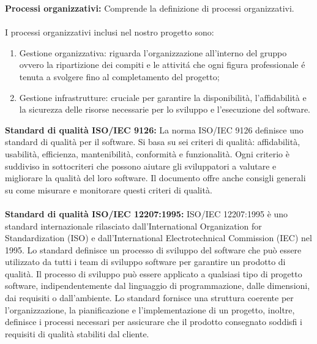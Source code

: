 \textbf{Processi organizzativi:}
Comprende la definizione di processi organizzativi.
\\\\
I processi organizzativi inclusi nel nostro progetto sono:
\begin{enumerate}
    \item Gestione organizzativa: riguarda l'organizzazione all'interno del gruppo ovvero la ripartizione dei compiti e le attivitá che ogni figura professionale é tenuta a svolgere fino al 
    completamento del progetto;
    \item Gestione infrastrutture: cruciale per garantire la disponibilità, l'affidabilità e la sicurezza delle risorse necessarie per lo sviluppo e l'esecuzione del software.
\end{enumerate}
\textbf{Standard di qualità ISO/IEC 9126:} La norma ISO/IEC 9126 definisce uno standard di qualità per il software. 
Si basa su sei criteri di qualità: affidabilità, usabilità, efficienza, mantenibilità, conformità e funzionalità. 
Ogni criterio è suddiviso in sottocriteri che possono aiutare gli sviluppatori a valutare e migliorare la qualità del loro software. 
Il documento offre anche consigli generali su come misurare e monitorare questi criteri di qualità.
\\\\
\textbf{Standard di qualità ISO/IEC 12207:1995:} ISO/IEC 12207:1995 è uno standard internazionale rilasciato dall'International Organization 
for Standardization (ISO) e dall'International Electrotechnical Commission (IEC) nel 1995. 
Lo standard definisce un processo di sviluppo del software che può essere utilizzato da tutti i team di sviluppo software per garantire 
un prodotto di qualità. Il processo di sviluppo può essere applicato a qualsiasi tipo di progetto software, indipendentemente dal 
linguaggio di programmazione, dalle dimensioni, dai requisiti o dall'ambiente. 
Lo standard fornisce una struttura coerente per l'organizzazione, la pianificazione e l'implementazione di un progetto, 
inoltre, definisce i processi necessari per assicurare che il prodotto consegnato soddisfi i requisiti di qualità stabiliti dal cliente.